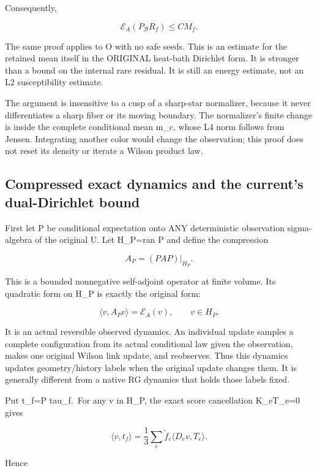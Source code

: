 \documentclass[
  11pt,
]{article}
\begin{document}
Consequently,

\[
 \boxed{\quad
 \mathcal E_A(P_{\mathcal B}R_f)\le C M_f.
 \quad}
 \tag{3.7}
\]

The same proof applies to O with no safe seeds. This is an estimate for
the retained mean itself in the ORIGINAL heat-bath Dirichlet form. It is
stronger than a bound on the internal rare residual. It is still an
energy estimate, not an L2 susceptibility estimate.

The argument is insensitive to a cusp of a sharp-star normalizer,
because it never differentiates a sharp fiber or its moving boundary.
The normalizer's finite change is inside the complete conditional mean
m\_c, whose L4 norm follows from Jensen. Integrating another color would
change the observation; this proof does not reset its density or iterate
a Wilson product law.

\hypertarget{compressed-exact-dynamics-and-the-currents-dual-dirichlet-bound}{%
\subsection{Compressed exact dynamics and the current's dual-Dirichlet
bound}\label{compressed-exact-dynamics-and-the-currents-dual-dirichlet-bound}}

First let P be conditional expectation onto ANY deterministic
observation sigma-algebra of the original U. Let H\_P=ran P and define
the compression

\[
 A_P=(PAP)|_{H_P}.
 \tag{4.1}
\]

This is a bounded nonnegative self-adjoint operator at finite volume.
Its quadratic form on H\_P is exactly the original form:

\[
 \langle v,A_Pv\rangle=\mathcal E_A(v),\qquad v\in H_P.
 \tag{4.2}
\]

It is an actual reversible observed dynamics. An individual update
samples a complete configuration from its actual conditional law given
the observation, makes one original Wilson link update, and reobserves.
Thus this dynamics updates geometry/history labels when the original
update changes them. It is generally different from a native RG dynamics
that holds those labels fixed.

Put t\_f=P tau\_f.~For any v in H\_P, the exact score cancellation
K\_eT\_e=0 gives

\[
 \langle v,t_f\rangle
 =\frac13\sum_e\widetilde f_e\langle D_ev,T_e\rangle.
 \tag{4.3}
\]

Hence
\end{document}
